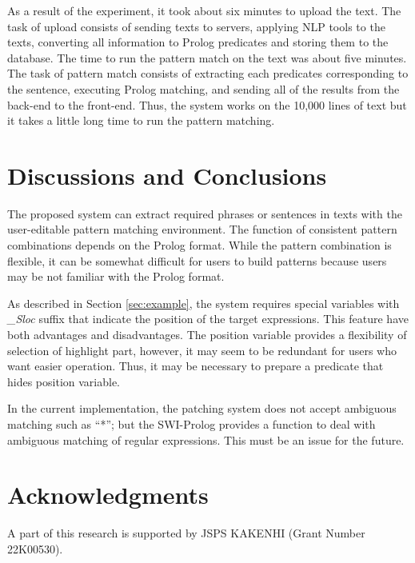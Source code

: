 \documentclass[conference]{IEEEtran}
\begin{document}
As a result of the experiment, it took about six minutes to upload the text.
The task of upload consists of sending texts to servers, applying NLP tools
to the texts, converting all information to Prolog predicates and storing them
to the database.
The time to run the pattern match on the text was about five minutes.
The task of pattern match consists of extracting each predicates corresponding to the sentence,
executing Prolog matching, and sending all of the results from the back-end to the front-end.
Thus, the system works on the 10,000 lines of text but it takes a little long time to run
the pattern matching.

\section{Discussions and Conclusions}
The proposed system can extract required phrases or sentences in texts with the user-editable
pattern matching environment. The function of consistent pattern combinations depends on the Prolog format.
While the pattern combination is flexible, it can be somewhat difficult for users to build patterns
because users may be not familiar with the Prolog format.

As described in Section \ref{sec:example},
the system requires special variables with {\it \_Sloc} suffix that indicate the position of the
target expressions. This feature have both advantages and disadvantages. The position variable
provides a flexibility of selection of highlight part, however, it may seem to be redundant for
users who want easier operation. Thus, it may be necessary to prepare a predicate that hides
position variable.

In the current implementation, the patching system does not accept ambiguous matching such as ``*'';
but the SWI-Prolog provides a function to deal with ambiguous matching of regular expressions.
This must be an issue for the future.

\section*{Acknowledgments}
A part of this research is supported by JSPS KAKENHI (Grant Number 22K00530).





\end{document}
